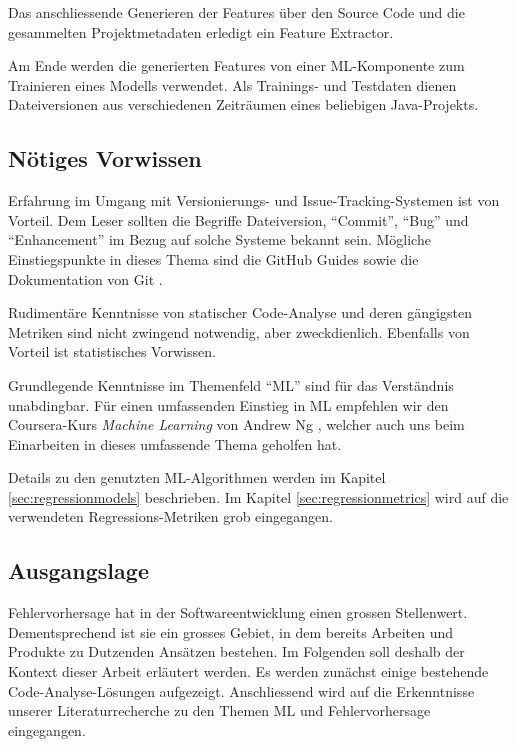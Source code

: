 \documentclass[10pt, a4paper]{article}
\begin{document}
Das anschliessende Generieren der Features über den Source Code und die gesammelten Projektmetadaten erledigt ein Feature Extractor.

Am Ende werden die generierten Features von einer \ac{ML}-Komponente zum Trainieren eines Modells verwendet. Als Trainings- und Testdaten dienen Dateiversionen aus verschiedenen Zeiträumen eines beliebigen Java-Projekts.

\subsection{Nötiges Vorwissen}
Erfahrung im Umgang mit Versionierungs- und Issue-Tracking-Systemen ist von Vorteil. Dem Leser sollten die Begriffe Dateiversion, ``Commit'', ``Bug'' und ``Enhancement'' im Bezug auf solche Systeme bekannt sein. Mögliche Einstiegspunkte in dieses Thema sind die GitHub Guides \cite{githubguides} sowie die Dokumentation von Git \cite{gitdocumentation}.

Rudimentäre Kenntnisse von statischer Code-Analyse und deren gängigsten Metriken sind nicht zwingend notwendig, aber zweckdienlich. Ebenfalls von Vorteil ist statistisches Vorwissen.

Grundlegende Kenntnisse im Themenfeld ``\acl{ML}'' sind für das Verständnis unabdingbar. Für einen umfassenden Einstieg in \ac{ML} empfehlen wir den Coursera-Kurs \emph{Machine Learning} von Andrew Ng \cite{ngcoursera}, welcher auch uns beim Einarbeiten in dieses umfassende Thema geholfen hat.

Details zu den genutzten \ac{ML}-Algorithmen werden im Kapitel \ref{sec:regressionmodels} beschrieben. Im Kapitel \ref{sec:regressionmetrics} wird auf die verwendeten Regressions-Metriken grob eingegangen.

\subsection{Ausgangslage}


Fehlervorhersage hat in der Softwareentwicklung einen grossen Stellenwert. Dementsprechend ist sie ein grosses Gebiet, in dem bereits Arbeiten und Produkte zu Dutzenden Ansätzen bestehen. Im Folgenden soll deshalb der Kontext dieser Arbeit erläutert werden. Es werden zunächst einige bestehende Code-Analyse-Lösungen aufgezeigt. Anschliessend wird auf die Erkenntnisse unserer Literaturrecherche zu den Themen \ac{ML} und Fehlervorhersage eingegangen.
\end{document}
